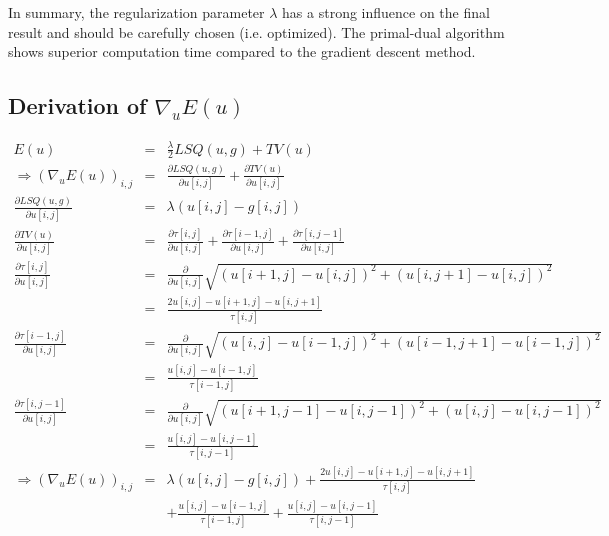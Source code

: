 \documentclass{paper}
\begin{document}
In summary, the regularization parameter \begin{math}\lambda\end{math} has a strong influence on the final result and should be carefully chosen (i.e. optimized). The primal-dual algorithm shows superior computation time compared to the gradient descent method.

\appendixpage
\begin{appendices}
 \section{Derivation of $\nabla_{u}E(u)$}
 \label{appendixDer}
\begin{flushleft}
\begin{eqnarray}
   E(u) &=& \frac{\lambda}{2}LSQ(u,g) + TV(u)\nonumber \\
   \Rightarrow (\nabla_{u}E(u))_{i,j} &=& \frac{\partial LSQ(u,g)}{\partial u[i,j]} + \frac{\partial TV(u)}{\partial u[i,j]} \nonumber \\
   \frac{\partial LSQ(u,g)}{\partial u[i,j]} &=& \lambda(u[i,j]-g[i,j]) \nonumber \\
   \frac{\partial TV(u)}{\partial u[i,j]} &=& \frac{\partial \tau[i,j]}{\partial u[i,j]} + \frac{\partial \tau[i-1,j]}{\partial u[i,j]} + \frac{\partial \tau[i,j-1]}{\partial u[i,j]} \nonumber \\
   \frac{\partial \tau[i,j]}{\partial u[i,j]} &=& \frac{\partial}{\partial u[i,j]}\sqrt{(u[i+1,j]-u[i,j])^2+(u[i,j+1]-u[i,j])^2} \nonumber \\
   &=& \frac{2u[i,j]-u[i+1,j]-u[i,j+1]}{\tau[i,j]} \nonumber \\
   \frac{\partial \tau[i-1,j]}{\partial u[i,j]} &=& \frac{\partial}{\partial u[i,j]}\sqrt{(u[i,j]-u[i-1,j])^2+(u[i-1,j+1]-u[i-1,j])^2} \nonumber \\
   &=& \frac{u[i,j]-u[i-1,j]}{\tau[i-1,j]} \nonumber \\
   \frac{\partial \tau[i,j-1]}{\partial u[i,j]} &=& \frac{\partial}{\partial u[i,j]}\sqrt{(u[i+1,j-1]-u[i,j-1])^2+(u[i,j]-u[i,j-1])^2} \nonumber \\
   &=& \frac{u[i,j]-u[i,j-1]}{\tau[i,j-1]} \nonumber \\
   \Rightarrow (\nabla_{u}E(u))_{i,j} &=& \lambda(u[i,j]-g[i,j]) + \frac{2u[i,j]-u[i+1,j]-u[i,j+1]}{\tau[i,j]} \nonumber \\
   && + \frac{u[i,j]-u[i-1,j]}{\tau[i-1,j]} + \frac{u[i,j]-u[i,j-1]}{\tau[i,j-1]} \nonumber
\end{eqnarray}
\end{flushleft}
 
 
 
\end{appendices}
\end{document}

